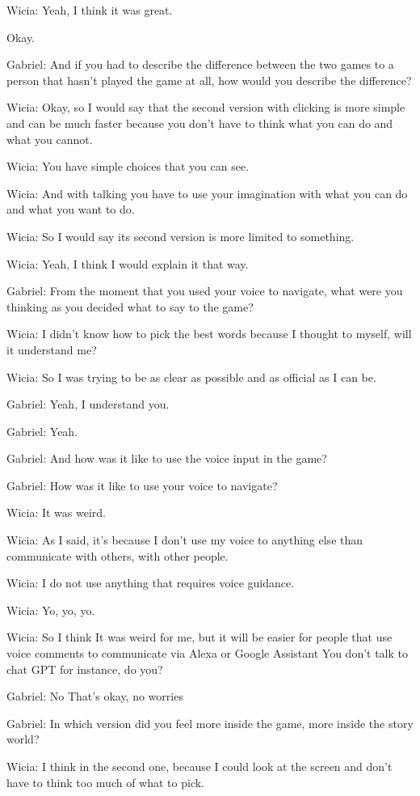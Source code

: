 Wicia: Yeah, I think it was great.

Okay.

Gabriel: And if you had to describe the difference between the two games to a person that hasn't played the game at all, how would you describe the difference?

Wicia: Okay, so I would say that the second version with clicking is more simple and can be much faster because you don't have to think what you can do and what you cannot.

Wicia: You have simple choices that you can see.

Wicia: And with talking you have to use your imagination with what you can do and what you want to do.

Wicia: So I would say its second version is more limited to something.

Wicia: Yeah, I think I would explain it that way.

Gabriel: From the moment that you used your voice to navigate, what were you thinking as you decided what to say to the game?

Wicia: I didn't know how to pick the best words because I thought to myself, will it understand me?

Wicia: So I was trying to be as clear as possible and as official as I can be.

Gabriel: Yeah, I understand you.

Gabriel: Yeah.

Gabriel: And how was it like to use the voice input in the game?

Gabriel: How was it like to use your voice to navigate?

Wicia: It was weird.

Wicia: As I said, it's because I don't use my voice to anything else than communicate with others, with other people.

Wicia: I do not use anything that requires voice guidance.

Wicia: Yo, yo, yo.

Wicia: So I think It was weird for me, but it will be easier for people that use voice comments to communicate via Alexa or Google Assistant You don't talk to chat GPT for instance, do you?

Gabriel: No That's okay, no worries

Gabriel: In which version did you feel more inside the game, more inside the story world?

Wicia: I think in the second one, because I could look at the screen and don't have to think too much of what to pick.

